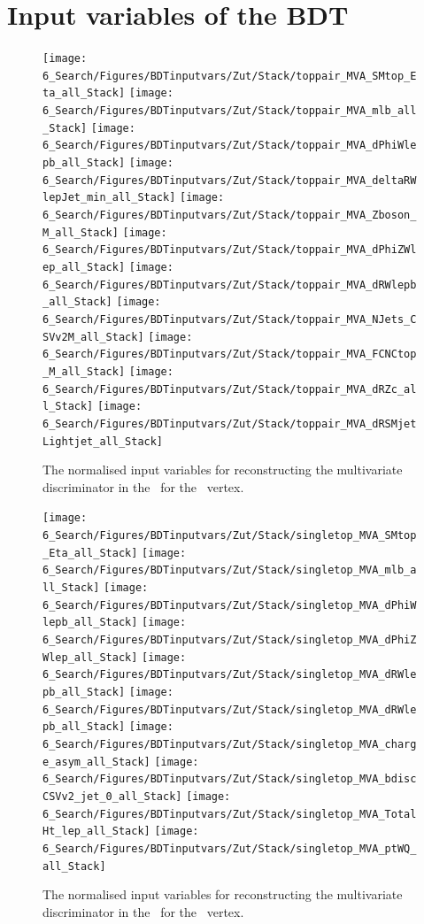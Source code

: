 \section{Input variables of the BDT}
\label{app:prefitBDTvar}
\begin{figure}[htbp]
	\centering
	\texttt{[image: 6\_Search/Figures/BDTinputvars/Zut/Stack/toppair\_MVA\_SMtop\_Eta\_all\_Stack]}
	\texttt{[image: 6\_Search/Figures/BDTinputvars/Zut/Stack/toppair\_MVA\_mlb\_all\_Stack]}
	\texttt{[image: 6\_Search/Figures/BDTinputvars/Zut/Stack/toppair\_MVA\_dPhiWlepb\_all\_Stack]}
	\texttt{[image: 6\_Search/Figures/BDTinputvars/Zut/Stack/toppair\_MVA\_deltaRWlepJet\_min\_all\_Stack]}
	\texttt{[image: 6\_Search/Figures/BDTinputvars/Zut/Stack/toppair\_MVA\_Zboson\_M\_all\_Stack]}
	\texttt{[image: 6\_Search/Figures/BDTinputvars/Zut/Stack/toppair\_MVA\_dPhiZWlep\_all\_Stack]}
	\texttt{[image: 6\_Search/Figures/BDTinputvars/Zut/Stack/toppair\_MVA\_dRWlepb\_all\_Stack]}
	\texttt{[image: 6\_Search/Figures/BDTinputvars/Zut/Stack/toppair\_MVA\_NJets\_CSVv2M\_all\_Stack]}
	\texttt{[image: 6\_Search/Figures/BDTinputvars/Zut/Stack/toppair\_MVA\_FCNCtop\_M\_all\_Stack]}
	\texttt{[image: 6\_Search/Figures/BDTinputvars/Zut/Stack/toppair\_MVA\_dRZc\_all\_Stack]}
	\texttt{[image: 6\_Search/Figures/BDTinputvars/Zut/Stack/toppair\_MVA\_dRSMjetLightjet\_all\_Stack]}
	\caption{The normalised input variables for reconstructing the multivariate discriminator in the \TTSR\ for the \Zut\ vertex.}
	\label{fig:toppairZutprefitstack}
\end{figure}

\begin{figure}[htbp]
	\centering
	\texttt{[image: 6\_Search/Figures/BDTinputvars/Zut/Stack/singletop\_MVA\_SMtop\_Eta\_all\_Stack]}
	\texttt{[image: 6\_Search/Figures/BDTinputvars/Zut/Stack/singletop\_MVA\_mlb\_all\_Stack]}
	\texttt{[image: 6\_Search/Figures/BDTinputvars/Zut/Stack/singletop\_MVA\_dPhiWlepb\_all\_Stack]}
	\texttt{[image: 6\_Search/Figures/BDTinputvars/Zut/Stack/singletop\_MVA\_dPhiZWlep\_all\_Stack]}
	\texttt{[image: 6\_Search/Figures/BDTinputvars/Zut/Stack/singletop\_MVA\_dRWlepb\_all\_Stack]}
	\texttt{[image: 6\_Search/Figures/BDTinputvars/Zut/Stack/singletop\_MVA\_dRWlepb\_all\_Stack]}
	\texttt{[image: 6\_Search/Figures/BDTinputvars/Zut/Stack/singletop\_MVA\_charge\_asym\_all\_Stack]}
	\texttt{[image: 6\_Search/Figures/BDTinputvars/Zut/Stack/singletop\_MVA\_bdiscCSVv2\_jet\_0\_all\_Stack]}
	\texttt{[image: 6\_Search/Figures/BDTinputvars/Zut/Stack/singletop\_MVA\_TotalHt\_lep\_all\_Stack]}
	\texttt{[image: 6\_Search/Figures/BDTinputvars/Zut/Stack/singletop\_MVA\_ptWQ\_all\_Stack]}
	\caption{The normalised input variables for reconstructing the multivariate discriminator in the \STSR\ for the \Zut\ vertex.}
	\label{fig:singletopZutprefitstack}
\end{figure}

